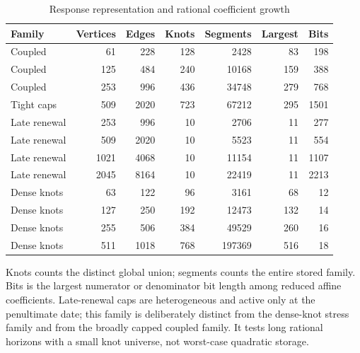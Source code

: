 \begin{table}[p]
\centering\small
\caption{Response representation and rational coefficient growth}\label{tab:representation}
\begin{tabular}{lrrrrrr}
\toprule
Family & Vertices & Edges & Knots & Segments & Largest & Bits \\
\midrule
Coupled & 61 & 228 & 128 & 2428 & 83 & 198 \\
Coupled & 125 & 484 & 240 & 10168 & 159 & 388 \\
Coupled & 253 & 996 & 436 & 34748 & 279 & 768 \\
Tight caps & 509 & 2020 & 723 & 67212 & 295 & 1501 \\
Late renewal & 253 & 996 & 10 & 2706 & 11 & 277 \\
Late renewal & 509 & 2020 & 10 & 5523 & 11 & 554 \\
Late renewal & 1021 & 4068 & 10 & 11154 & 11 & 1107 \\
Late renewal & 2045 & 8164 & 10 & 22419 & 11 & 2213 \\
Dense knots & 63 & 122 & 96 & 3161 & 68 & 12 \\
Dense knots & 127 & 250 & 192 & 12473 & 132 & 14 \\
Dense knots & 255 & 506 & 384 & 49529 & 260 & 16 \\
Dense knots & 511 & 1018 & 768 & 197369 & 516 & 18 \\
\bottomrule
\end{tabular}
\par\smallskip\begin{minipage}{\textwidth}\footnotesize Knots counts the distinct global union; segments counts the entire stored family. Bits is the largest numerator or denominator bit length among reduced affine coefficients. Late-renewal caps are heterogeneous and active only at the penultimate date; this family is deliberately distinct from the dense-knot stress family and from the broadly capped coupled family. It tests long rational horizons with a small knot universe, not worst-case quadratic storage.\end{minipage}
\end{table}

